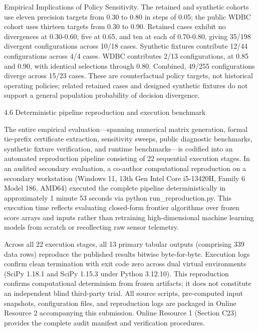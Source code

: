 \documentclass[11pt,a4paper]{article}
\begin{document}
Empirical Implications of Policy Sensitivity. The retained and synthetic cohorts use eleven precision targets from 0.30 to 0.80 in steps of 0.05; the public WDBC cohort uses thirteen targets from 0.30 to 0.90. Retained cases exhibit no divergences at 0.30-0.60, five at 0.65, and ten at each of 0.70-0.80, giving 35/198 divergent configurations across 10/18 cases. Synthetic fixtures contribute 12/44 configurations across 4/4 cases. WDBC contributes 2/13 configurations, at 0.85 and 0.90, with identical selections through 0.80. Combined, 49/255 configurations diverge across 15/23 cases. These are counterfactual policy targets, not historical operating policies; related retained cases and designed synthetic fixtures do not support a general population probability of decision divergence.

4.6 Deterministic pipeline reproduction and execution benchmark

The entire empirical evaluation---spanning numerical matrix generation, formal tie-prefix certificate extraction, sensitivity sweeps, public diagnostic benchmarks, synthetic fixture verification, and runtime benchmarks---is codified into an automated reproduction pipeline consisting of 22 sequential execution stages. In an audited secondary evaluation, a co-author computational reproduction on a secondary workstation (Windows 11, 13th Gen Intel Core i5-13420H, Family 6 Model 186, AMD64) executed the complete pipeline deterministically in approximately 1 minute 53 seconds via python run\_reproduction.py. This execution time reflects evaluating closed-form frontier algorithms over frozen score arrays and inputs rather than retraining high-dimensional machine learning models from scratch or recollecting raw sensor telemetry.

Across all 22 execution stages, all 13 primary tabular outputs (comprising 339 data rows) reproduce the published results bitwise byte-for-byte. Execution logs confirm clean termination with exit code zero across dual virtual environments (SciPy 1.18.1 and SciPy 1.15.3 under Python 3.12.10). This reproduction confirms computational determinism from frozen artifacts; it does not constitute an independent blind third-party trial. All source scripts, pre-computed input snapshots, configuration files, and reproduction logs are packaged in Online Resource 2 accompanying this submission. Online Resource 1 (Section C23) provides the complete audit manifest and verification procedures.
\end{document}
